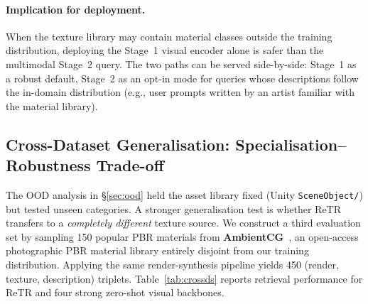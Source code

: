 \documentclass[10pt,twocolumn]{article}
\begin{document}
\paragraph{Implication for deployment.}
When the texture library may contain material classes outside the training
distribution, deploying the Stage~1 visual encoder alone is safer than the
multimodal Stage~2 query.
The two paths can be served side-by-side: Stage~1 as a robust default,
Stage~2 as an opt-in mode for queries whose descriptions follow the in-domain
distribution (e.g., user prompts written by an artist familiar with the
material library).

\subsection{Cross-Dataset Generalisation: Specialisation--Robustness Trade-off}
\label{sec:crossds}

The OOD analysis in \S\ref{sec:ood} held the asset library fixed (Unity
\texttt{SceneObject/}) but tested unseen categories.
A stronger generalisation test is whether ReTR transfers to a
\emph{completely different} texture source.
We construct a third evaluation set by sampling 150 popular PBR materials
from \textbf{AmbientCG}~\cite{ambientcg}, an open-access photographic
PBR material library entirely disjoint from our training distribution.
Applying the same render-synthesis pipeline yields 450 (render, texture,
description) triplets.
Table~\ref{tab:crossds} reports retrieval performance for ReTR and four
strong zero-shot visual backbones.

\begin{table}[h]
\centering
\caption{Cross-dataset evaluation on 450 AmbientCG triplets.
         \emph{ReTR loses to all generic visual backbones; the strongest
         transfer model is DINOv2-large.}}
\label{tab:crossds}
\end{table}
\end{document}
